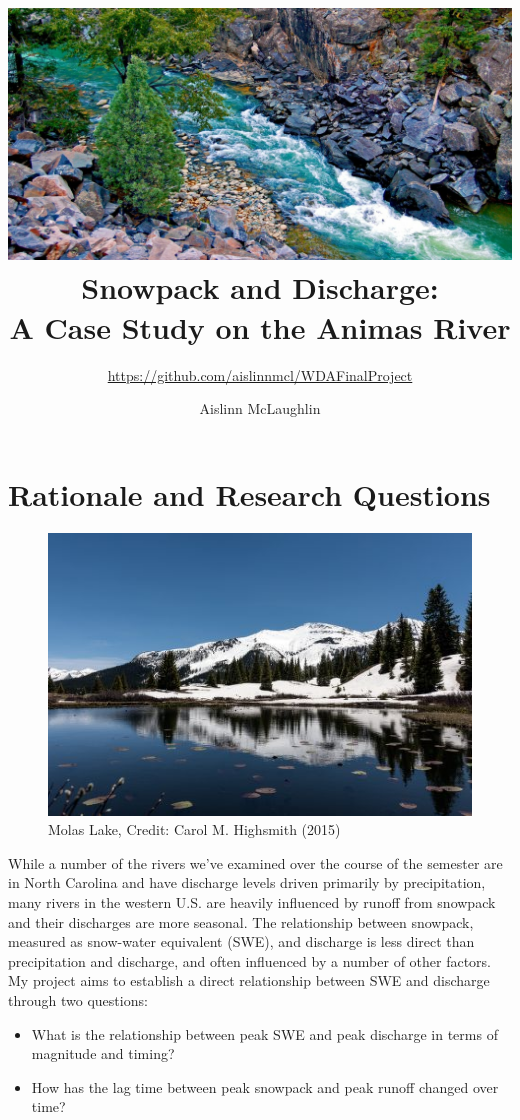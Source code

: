 \documentclass[
  12pt,
]{article}
\title{\includegraphics{animas_river.jpg}\\
Snowpack and Discharge:\\
A Case Study on the Animas River}
\subtitle{\url{https://github.com/aislinnmcl/WDAFinalProject}}
\author{Aislinn McLaughlin}
\date{}
\begin{document}
\maketitle

\newpage

\hypertarget{rationale-and-research-questions}{%
\section{Rationale and Research
Questions}\label{rationale-and-research-questions}}

\begin{figure}
\centering
\includegraphics{molas_lake.jpg}
\caption{Molas Lake, Credit: Carol M. Highsmith (2015)}
\end{figure}

While a number of the rivers we've examined over the course of the
semester are in North Carolina and have discharge levels driven
primarily by precipitation, many rivers in the western U.S. are heavily
influenced by runoff from snowpack and their discharges are more
seasonal. The relationship between snowpack, measured as snow-water
equivalent (SWE), and discharge is less direct than precipitation and
discharge, and often influenced by a number of other factors. My project
aims to establish a direct relationship between SWE and discharge
through two questions:

\begin{itemize}
\item
  What is the relationship between peak SWE and peak discharge in terms
  of magnitude and timing?
\item
  How has the lag time between peak snowpack and peak runoff changed
  over time?
\end{itemize}
\end{document}
